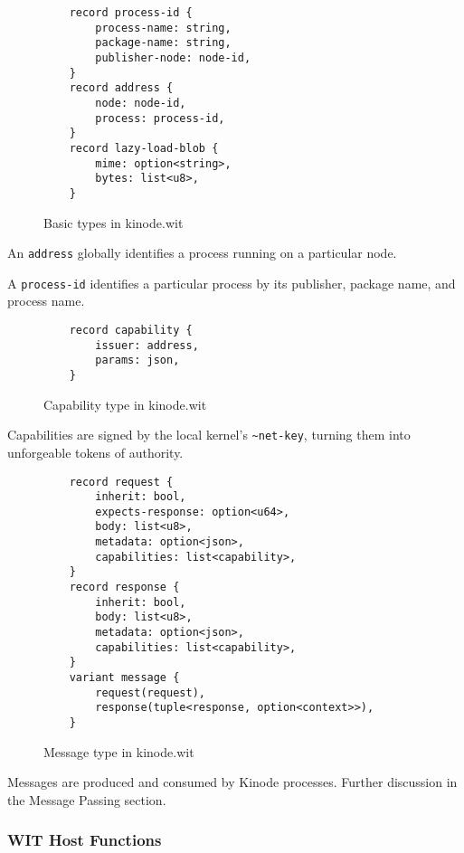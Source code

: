 \documentclass[runningheads]{llncs}
\begin{document}
\begin{figure}[htbp]
    \centering
    \begin{lstlisting}
    record process-id {
        process-name: string,
        package-name: string,
        publisher-node: node-id,
    }
    record address {
        node: node-id,
        process: process-id,
    }
    record lazy-load-blob {
        mime: option<string>,
        bytes: list<u8>,
    }
    \end{lstlisting}
    \caption{Basic types in kinode.wit}
    \label{fig:WIT Types 1}
\end{figure}

An \verb|address| globally identifies a process running on a particular node.

A \verb|process-id| identifies a particular process by its publisher, package name, and process name.

\begin{figure}
    \centering
    \begin{lstlisting}
    record capability {
        issuer: address,
        params: json,
    }
    \end{lstlisting}
    \caption{Capability type in kinode.wit}
    \label{fig:WIT Types 3}
\end{figure}

Capabilities are signed by the local kernel's \verb|~net-key|, turning them into unforgeable tokens of authority.

\begin{figure}
    \centering
    \begin{lstlisting}
    record request {
        inherit: bool,
        expects-response: option<u64>,
        body: list<u8>,
        metadata: option<json>,
        capabilities: list<capability>,
    }
    record response {
        inherit: bool,
        body: list<u8>,
        metadata: option<json>,
        capabilities: list<capability>,
    }
    variant message {
        request(request),
        response(tuple<response, option<context>>),
    }
    \end{lstlisting}
    \caption{Message type in kinode.wit}
    \label{fig:WIT Types 2}
\end{figure}

Messages are produced and consumed by Kinode processes. Further discussion in the Message Passing section.

\subsubsection{WIT Host Functions}
\end{document}
